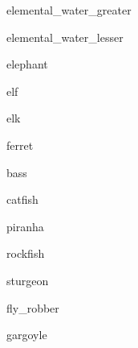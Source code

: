 \documentclass[letterpaper,serif]{module}
\begin{document}
\begin{newmonster}{elemental_water_greater}\end{newmonster}

\begin{newmonster}{elemental_water_lesser}\end{newmonster}

\begin{newmonster}{elephant}\end{newmonster}

\begin{newmonster}{elf}\end{newmonster}

\begin{newmonster}{elk}\end{newmonster}

\begin{newmonster}{ferret}\end{newmonster}

\begin{newmonster}{bass}\end{newmonster}

\begin{newmonster}{catfish}\end{newmonster}

\begin{newmonster}{piranha}\end{newmonster}

\begin{newmonster}{rockfish}\end{newmonster}

\begin{newmonster}{sturgeon}\end{newmonster}

\begin{newmonster}{fly_robber}\end{newmonster}

\begin{newmonster}{gargoyle}\end{newmonster}
\end{document}
